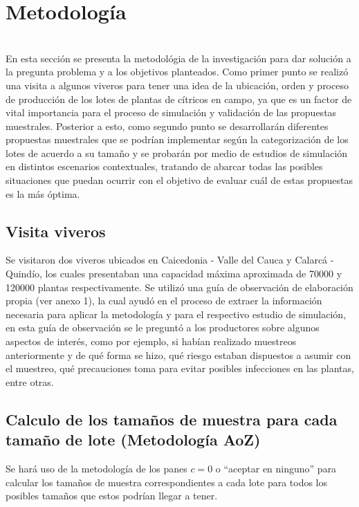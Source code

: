 \chapter{Metodolog\'{i}a}
~\\En esta secci\'{o}n se presenta la metodol\'{o}gia de la investigaci\'{o}n para dar soluci\'{o}n a la pregunta problema y a los objetivos planteados. Como primer punto se realiz\'{o} una visita a algunos viveros para tener una idea de la ubicaci\'{o}n, orden y proceso de producci\'{o}n de los lotes de plantas de c\'{i}tricos en campo, ya que es un factor de vital importancia para el proceso de simulaci\'{o}n y validaci\'{o}n de las propuestas muestrales. Posterior a esto, como segundo punto se desarrollar\'{a}n diferentes propuestas muestrales que se podr\'{i}an implementar seg\'{u}n la categorizaci\'{o}n de los lotes de acuerdo a su tama\~{n}o y se probar\'{a}n por medio de estudios de simulaci\'{o}n en distintos escenarios contextuales, tratando de abarcar todas las posibles situaciones que puedan ocurrir con el objetivo de evaluar cu\'{a}l de estas propuestas es la m\'{a}s \'{o}ptima. 

\section{Visita viveros}
Se visitaron dos viveros ubicados en Caicedonia - Valle del Cauca y Calarc\'{a} - Quind\'{i}o, los cuales presentaban una capacidad m\'{a}xima aproximada de 70000 y 120000 plantas respectivamente. Se utiliz\'{o} una gu\'{i}a de observaci\'{o}n de elaboraci\'{o}n propia (ver anexo 1), la cual ayud\'{o} en el proceso de extraer la informaci\'{o}n necesaria para aplicar la metodolog\'{i}a y para el respectivo estudio de simulaci\'{o}n, en esta gu\'{i}a de observaci\'{o}n se le pregunt\'{o} a los productores sobre algunos aspectos de inter\'{e}s, como por ejemplo, si hab\'{i}an realizado muestreos anteriormente y de qu\'{e} forma se hizo, qu\'{e} riesgo estaban dispuestos a asumir con el muestreo, qu\'{e} precauciones toma para evitar posibles infecciones en las plantas, entre otras.  

\section{Calculo de los tama\~{n}os de muestra para cada tama\~{n}o de lote (Metodolog\'{i}a AoZ)} 

Se har\'{a} uso de la metodolog\'{i}a de los panes $c=0$ o ``aceptar en ninguno'' para calcular los tama\~{n}os de muestra correspondientes a cada lote para todos los posibles tama\~{n}os que estos podr\'{i}an llegar a tener.


